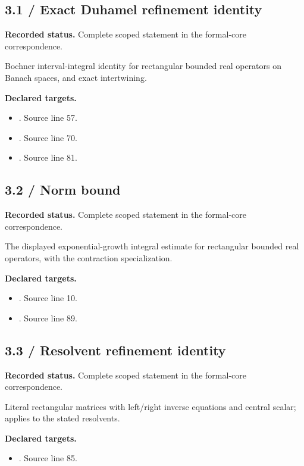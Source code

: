 \subsection{3.1 / Exact Duhamel refinement identity}
\label{result:3.1}
\textbf{Recorded status.} Complete scoped statement in the formal-core correspondence.\par
Bochner interval-integral identity for rectangular bounded real operators on Banach spaces, and exact intertwining.

\textbf{Declared targets.}\begin{itemize}
\item {}. Source line 57.
\item {}. Source line 70.
\item {}. Source line 81.
\end{itemize}
\subsection{3.2 / Norm bound}
\label{result:3.2}
\textbf{Recorded status.} Complete scoped statement in the formal-core correspondence.\par
The displayed exponential-growth integral estimate for rectangular bounded real operators, with the contraction specialization.

\textbf{Declared targets.}\begin{itemize}
\item {}. Source line 10.
\item {}. Source line 89.
\end{itemize}
\subsection{3.3 / Resolvent refinement identity}
\label{result:3.3}
\textbf{Recorded status.} Complete scoped statement in the formal-core correspondence.\par
Literal rectangular matrices with left/right inverse equations and central scalar; applies to the stated resolvents.

\textbf{Declared targets.}\begin{itemize}
\item {}. Source line 85.
\end{itemize}
